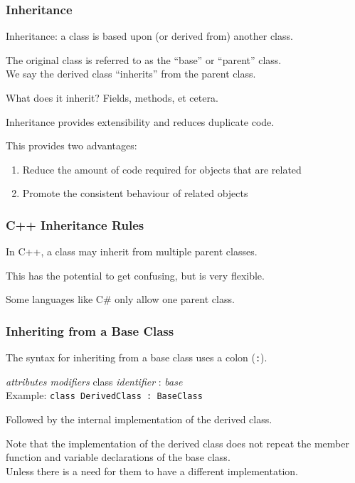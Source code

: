 \begin{frame}
\frametitle{Inheritance}

Inheritance: a class is based upon (or derived from) another class.

The original class is referred to as the ``base'' or ``parent'' class.\\
\quad We say the derived class ``inherits'' from the parent class.

What does it inherit? Fields, methods, et cetera.

Inheritance provides extensibility and reduces duplicate code.

This provides two advantages:
\begin{enumerate}
    \item Reduce the amount of code required for objects that are related
    \item Promote the consistent behaviour of related objects
\end{enumerate}

\end{frame}

\begin{frame}
\frametitle{C++ Inheritance Rules}

In C++, a class may inherit from multiple parent classes.

This has the potential to get confusing, but is very flexible.

Some languages like C\# only allow one parent class.

\end{frame}


\begin{frame}
\frametitle{Inheriting from a Base Class}

The syntax for inheriting from a base class uses a colon (\texttt{:}).

\textit{attributes modifiers} class \textit{identifier} : \textit{base}\\
\quad Example: \texttt{class DerivedClass : BaseClass}

Followed by the internal implementation of the derived class.

Note that the implementation of the derived class does not repeat the member function and variable declarations of the base class.\\
\quad Unless there is a need for them to have a different implementation.

\end{frame}


